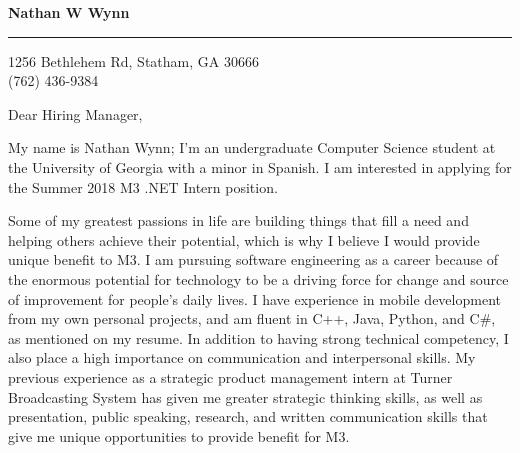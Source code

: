 \documentclass{letter} %
\begin{document}
\signature{Nathan W Wynn}           %
\longindentation=0pt                       %
\let\raggedleft\raggedright                %
 
 
\begin{letter}%


\begin{flushleft}
{\large\bf Nathan W Wynn}
\end{flushleft}
\medskip\hrule height 1pt
\begin{flushright}
\hfill 1256 Bethlehem Rd, Statham, GA 30666 \\
\hfill (762) 436-9384
\end{flushright} 
\vfill %

 
\opening{Dear Hiring Manager,} 
 
\noindent My name is Nathan Wynn; I'm an undergraduate Computer Science student at the University of Georgia with a minor in Spanish. I am interested in applying for the Summer 2018 M3 .NET Intern position.
 
\noindent Some of my greatest passions in life are building things that fill a need and helping others achieve their potential, which is why I believe I would provide unique benefit to M3. I am pursuing software engineering as a career because of the enormous potential for technology to be a driving force for change and source of improvement for people's daily lives. I have experience in mobile development from my own personal projects, and am fluent in C++, Java, Python, and C$\#$, as mentioned on my resume. In addition to having strong technical competency, I also place a high importance on communication and interpersonal skills. My previous experience as a strategic product management intern at Turner Broadcasting System has given me greater strategic thinking skills, as well as presentation, public speaking, research, and written communication skills that give me unique opportunities to provide benefit for M3.
 

\end{letter}
\end{document}
